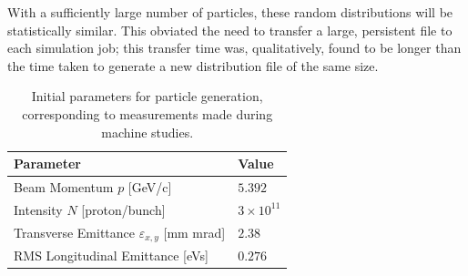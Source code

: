 \documentclass[a4paper,twoside,11pt]{report}
\begin{document}
With a sufficiently large number of particles, these random distributions will be statistically similar. This obviated the need to transfer a large, persistent file to each simulation job; this transfer time was, qualitatively, found to be longer than the time taken to generate a new distribution file of the same size.

\begin{table}[]
  \centering
  \begin{tabular}{ll}
    \centering
  Parameter                                       & Value \\ \hline \hline
  Beam Momentum $p$ [GeV/c]                       & $5.392$ \\
  Intensity $N$ [proton/bunch]                    & $3\times10^{11}$ \\
  Transverse Emittance $\varepsilon_{x,y}$ [mm mrad]  & $2.38$ \\
  RMS Longitudinal Emittance [eVs]                & $0.276$
  \end{tabular}
  \caption[Initial particle generation parameters]{Initial parameters for particle generation, corresponding to measurements made during machine studies.}\label{tab:initial-conditions}
\end{table}
\end{document}
